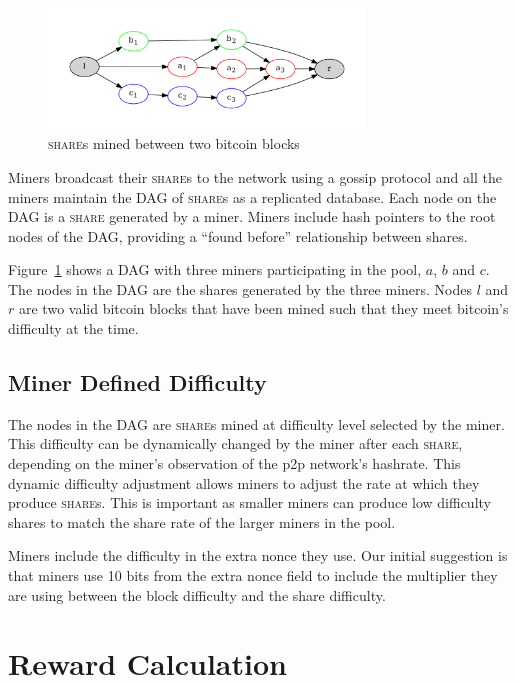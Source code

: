 \documentclass{article}
\begin{document}
\begin{figure}
  \begin{center}
    \includegraphics[width=0.75\textwidth]{dag}
    \caption{\textsc{share}s mined between two bitcoin blocks}\label{fig:dag}
  \end{center}
\end{figure}

Miners broadcast their \textsc{share}s to the network using a gossip
protocol and all the miners maintain the DAG of \textsc{share}s as a
replicated database. Each node on the DAG is a \textsc{share}
generated by a miner. Miners include hash pointers to the root nodes
of the DAG, providing a ``found before'' relationship between shares.

Figure~\ref{fig:dag} shows a DAG with three miners participating
in the pool, $a$, $b$ and $c$. The nodes in the DAG are the shares
generated by the three miners. Nodes $l$ and $r$ are two valid bitcoin
blocks that have been mined such that they meet bitcoin's difficulty
at the time.

\subsection{Miner Defined Difficulty}\label{sec:share-difficulty}

The nodes in the DAG are \textsc{share}s mined at difficulty level
selected by the miner. This difficulty can be dynamically changed by
the miner after each \textsc{share}, depending on the miner's
observation of the p2p network's hashrate. This dynamic difficulty
adjustment allows miners to adjust the rate at which they produce
\textsc{share}s. This is important as smaller miners can produce low
difficulty shares to match the share rate of the larger miners in the
pool.

Miners include the difficulty in the extra nonce they use. Our initial
suggestion is that miners use 10 bits from the extra nonce field to
include the multiplier they are using between the block difficulty and
the share difficulty.

\section{Reward Calculation}\label{sec:rewards}
\end{document}
